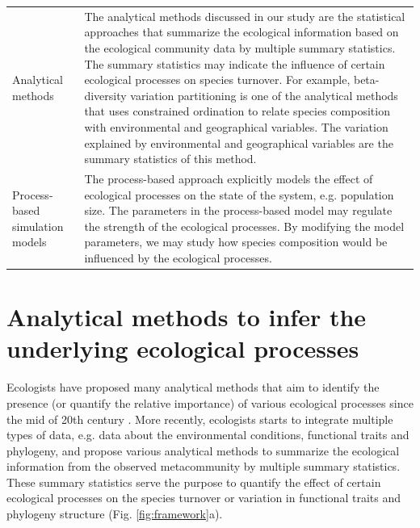 {\begin{footnotesize}
\begin{longtable}{p{}p{}}
			Analytical methods & The analytical methods discussed in our study are the statistical approaches that summarize the ecological information based on the ecological community data by multiple summary statistics. The summary statistics may indicate the influence of certain ecological processes on species turnover. For example, beta-diversity variation partitioning is one of the analytical methods that uses constrained ordination to relate species composition with environmental and geographical variables. The variation explained by environmental and geographical variables are the summary statistics of this method.\\
			Process-based simulation models & The process-based approach explicitly models the effect of ecological processes on the state of the system, e.g. population size. The parameters in the process-based model may regulate the strength of the ecological processes. By modifying the model parameters, we may study how species composition would be influenced by the ecological processes.\\
			\bottomrule
		\end{longtable}
	\end{footnotesize}
}

\section{Analytical methods to infer the underlying ecological processes}
\noindent
Ecologists have proposed many analytical methods that aim to identify the presence (or quantify the relative importance) of various ecological processes since the mid of 20th century \citep{macarthur1958population, diamond1975island}. More recently, ecologists starts to integrate multiple types of data, e.g. data about the environmental conditions, functional traits and phylogeny, and propose various analytical methods to summarize the ecological information from the observed metacommunity by multiple summary statistics. These summary statistics serve the purpose to quantify the effect of certain ecological processes on the species turnover or variation in functional traits and phylogeny structure (Fig. \ref{fig:framework}a). 

